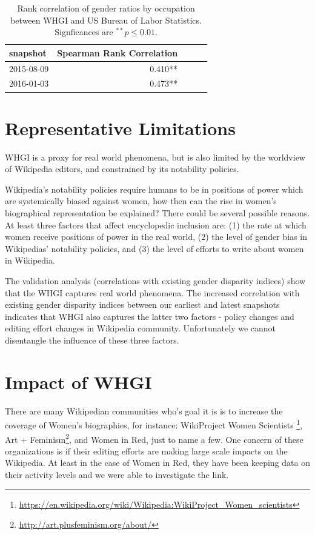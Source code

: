 \documentclass{sig-alternate-05-2015}
\begin{document}
\begin{table}
\caption{Rank correlation of gender ratios by occupation between WHGI and US
Bureau of Labor Statistics. Signficances are $ ^{**}p\leq 0.01$.}
\begin{tabular}{lrrrr}
\toprule
snapshot &  Spearman Rank Correlation \\
\midrule
2015-08-09 & 0.410**  \\
2016-01-03 & 0.473**  \\
\bottomrule
\end{tabular}
\label{table:bls}
\end{table}

\section{Representative Limitations}
WHGI is a proxy for real world phenomena, but is also limited by the worldview of Wikipedia editors, and constrained by its notability policies. 

Wikipedia's notability policies require humans to be in positions of power which are systemically biased against women, how then can the rise in women's biographical representation be explained? There could be several possible reasons. At least three factors that affect encyclopedic inclusion are: (1) the rate at which women receive positions of power in the real world, (2) the level of gender bias in Wikipedias' notability policies, and (3) the level of efforts to write about women in Wikipedia. 

The validation analysis (correlations with existing gender disparity indices) show that the WHGI captures real world phenomena. The increased correlation with existing gender disparity indices between our earliest and latest snapshots indicates that WHGI also captures the latter two factors - policy changes and editing effort changes in Wikipedia community. Unfortunately we cannot disentangle the influence of these three factors.

\section{Impact of WHGI}
There are many Wikipedian communities who's goal it is is to increase the coverage of Women's biographies, for instance: Wiki\-Project Women Scientists \footnote{\url{https://en.wikipedia.org/wiki/Wikipedia:WikiProject_Women_scientists}}, Art + Feminism\footnote{\url{http://art.plusfeminism.org/about/}}, and Women in Red, just to name a few. One concern of these organizations is if their editing efforts are making large scale impacts on the Wikipedia. At least in the case of Women in Red, they have been keeping data on their activity levels and we were able to investigate the link.
\end{document}
